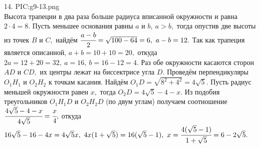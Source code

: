 14. {{PIC:g9-13.png}}\\
Высота трапеции в два раза больше радиуса вписанной окружности и равна $2\cdot4=8.$ Пусть меньшее основания равны $a$ и $b,\ a>b,$ тогда опустив две высоты из точек $B$ и $C,$ найдём $\cfrac{a-b}{2}=\sqrt{100-64}=6,\ a-b=12.$ Так как трапеция является описанной, $a+b=10+10=20,$ откуда $2a=12+20=32,\ a=16,\ b=16-12=4.$ Раз обе окружности касаются сторон $AD$ и $CD,$ их центры лежат на биссектрисе угла $D.$ Проведём перпендикуляры $O_1H_1$ и $O_2H_2$ к точкам касания. Найдём $O_1D=\sqrt{8^2+4^2}=4\sqrt{5}.$ Пусть радиус меньшей окружности равен $x,$ тогда  $O_2D=4\sqrt{5}-4-x.$ Из подобия треугольников $O_1H_1D$ и $O_2H_2D$ (по двум углам) получаем соотношение $\cfrac{4\sqrt{5}-4-x }{4\sqrt{5}}=\cfrac{x}{4},$ откуда $16\sqrt{5}-16-4x=4\sqrt{5}x,\ 4x(1+\sqrt{5})=16(\sqrt{5}-1),\ x=\cfrac{4(\sqrt{5}-1)}{1+\sqrt{5}}=6-2\sqrt{5}.$\\
